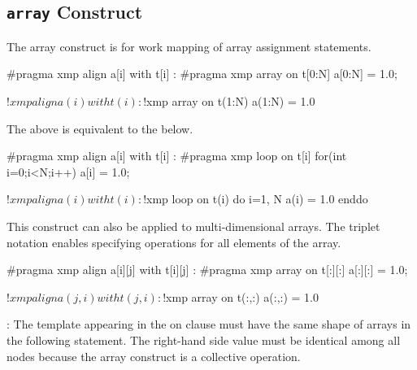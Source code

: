 \subsection{{\tt array} Construct}

The array construct is for work mapping of array assignment statements.

\begin{XCexample}
#pragma xmp align a[i] with t[i]
  :
#pragma xmp array on t[0:N]
a[0:N] = 1.0;
\end{XCexample}

\begin{XFexample}
!$xmp align a(i) with t(i)
  :
!$xmp array on t(1:N)
a(1:N) = 1.0
\end{XFexample}

The above is equivalent to the below.

\begin{XCexample}
#pragma xmp align a[i] with t[i]
  :
#pragma xmp loop on t[i]
for(int i=0;i<N;i++)
  a[i] = 1.0;
\end{XCexample}

\begin{XFexample}
!$xmp align a(i) with t(i)
  :
!$xmp loop on t(i)
do i=1, N
  a(i) = 1.0
enddo
\end{XFexample}

This construct can also be applied to multi-dimensional arrays. The
triplet notation enables specifying operations for all elements of the
array.

\begin{XCexample}
#pragma xmp align a[i][j] with t[i][j]
  :
#pragma xmp array on t[:][:]
a[:][:] = 1.0;
\end{XCexample}

\begin{XFexample}
!$xmp align a(j,i) with t(j,i)
  :
!$xmp array on t(:,:)
a(:,:) = 1.0
\end{XFexample}

\noindent\hrulefill

: The template appearing in the on clause must have
the same shape of
arrays in the following statement. The right-hand side value must be
identical among all nodes because the array construct is a collective
operation.

\noindent\hrulefill
